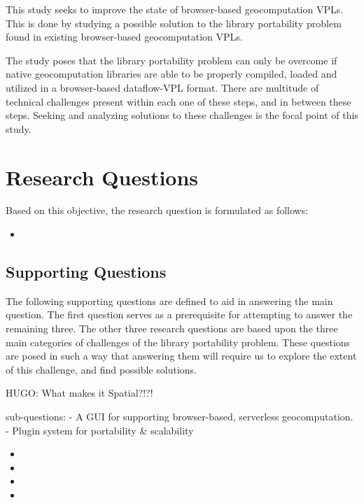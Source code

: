 This study seeks to improve the state of browser-based geocomputation VPLs.
This is done by studying a possible solution to the library portability problem found in existing browser-based geocomputation VPLs.

The study poses that the library portability problem can only be overcome if native geocomputation libraries are able to be properly compiled, loaded and utilized in a browser-based dataflow-VPL format. 
There are multitude of technical challenges present within each one of these steps, and in between these steps. 
Seeking and analyzing solutions to these challenges is the focal point of this study. 


\section{Research Questions}
Based on this objective, the research question is formulated as follows: 
\begin{itemize}[ ]
  \item \myMainRQ
\end{itemize}


\subsection*{Supporting Questions}
The following supporting questions are defined to aid in answering the main question.
The first question serves as a prerequisite for attempting to answer the remaining three. 
The other three research questions are based upon the three main categories of challenges of the library portability problem.  
These questions are posed in such a way that answering them will require us to explore the extent of this challenge, and find possible solutions.

\begin{note}
  HUGO: What makes it Spatial?!?!

  sub-questions: 
- A GUI for supporting browser-based, serverless geocomputation.
- Plugin system for portability & scalability


\end{note}

\begin{itemize}[-]
  \item \mySubRQOne
  \item \mySubRQTwo
  \item \mySubRQThree
  \item \mySubRQFour
\end{itemize}

